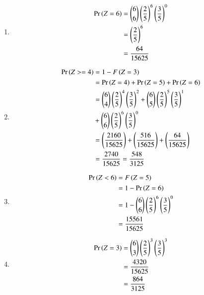 \documentclass[journal,12pt,twocolumn]{IEEEtran}
\begin{document}
\begin{enumerate}
	\item 
	\begin{align}
		\Pr\left(Z = 6\right) &= \binom{6}{6}\left(\frac{2}{5}\right)^6\left(\frac{3}{5}\right)^{0}
		\\&= \left(\frac{2}{5}\right)^6 \\&= \frac{64}{15625} 
	\end{align}
	
	
	\item 
	\begin{align}
		\Pr\left(Z>=4\right) &=1-F\left(Z=3\right)
		\\&= \Pr\left(Z = 4\right)+\Pr\left(Z=5\right)+\Pr\left(Z = 6\right) \\&= 
		\binom{6}{4}\left(\frac{2}{5}\right)^4\left(\frac{3}{5}\right)^2
		+\binom{6}{5}\left(\frac{2}{5}\right)^5\left(\frac{3}{5}\right)^1
		\\&+\binom{6}{6}\left(\frac{2}{5}\right)^6\left(\frac{3}{5}\right)^0\nonumber
		\\&= \left(\frac{2160}{15625}\right)
		+\left(\frac{516}{15625}\right)+
		\left(\frac{64}{15625}\right) \\&= \frac{2740}{15625} =\frac{548}{3125} 
	\end{align}
	
	\item 
	\begin{align}
		\Pr\left(Z < 6\right) &= F\left(Z=5\right) 
		\\&= 1-\Pr\left(Z = 6\right) \\&= 1 - \binom{6}{6}\left(\frac{2}{5}\right)^6\left(\frac{3}{5}\right)^0
		\\&= \frac{15561}{15625}  
	\end{align}
	
	\item 
	\begin{align}
		\Pr\left(Z = 3\right) &= \binom{6}{3}\left(\frac{2}{5}\right)^3\left(\frac{3}{5}\right)^3 \\&= \frac{4320}{15625}
		\\&= \frac{864}{3125} 
	\end{align}
\end{enumerate}
\end{document}
